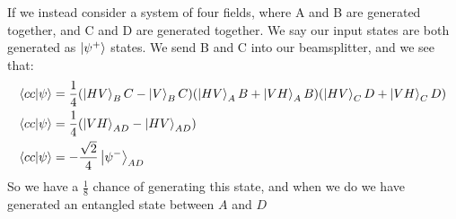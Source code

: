 If we instead consider a system of four fields, where A and B are generated together, and C and D are generated together. We say our input states are both generated as $\ket{\psi^+}$ states.
We send B and C into our beamsplitter, and we see that:
\begin{align*}
	\bra{cc}\ket{\psi} &= \frac{1}{4}(\ket{HV}_BC - \ket{V}_BC)(\ket{HV}_AB + \ket{VH}_AB)(\ket{HV}_CD + \ket{VH}_CD) \\
	\bra{cc}\ket{\psi} &= \frac{1}{4}(\ket{VH}_{AD} - \ket{HV}_{AD}) \\
	\bra{cc}\ket{\psi} &= -\frac{\sqrt{2}}{4}\ket{\psi^-}_{AD}
\end{align*}
So we have a $\frac{1}{8}$ chance of generating this state, and when we do we have generated an entangled state between $A$ and $D$
